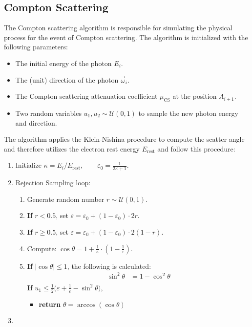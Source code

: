 \subsection{Compton Scattering}

The Compton scattering algorithm is responsible for simulating the physical process for the event of Compton scattering. The algorithm is initialized with the following parameters:
\begin{itemize}
    \item The initial energy of the photon $E_i$.
    \item The (unit) direction of the photon $\vec{\omega}_i$.
    \item The Compton scattering attenuation coefficient $\mu_{\text{CS}}$ at the position
    $A_{i+1}$.
    \item Two random variables $u_1, u_2 \sim \mathcal{U}(0, 1)$ to sample the
    new photon energy and direction.
\end{itemize}

The algorithm applies the Klein-Nishina procedure to compute the scatter angle
and therefore utilizes the electron rest energy $E_\text{rest}$ and follow this
procedure:

\begin{enumerate}[label=\Roman*.]
    \item Initialize $\kappa = E_i/ E_\text{rest}, \qquad \varepsilon_0 = \frac{1}{2\kappa + 1}$.
    \item Rejection Sampling loop:
        \begin{enumerate}[label=\arabic*.]
            \item Generate random number $r\sim\mathcal{U}(0,1)$.
            \item \textbf{If} $r < 0.5$, set $\varepsilon = \varepsilon_0 +
            (1-\varepsilon_0) \cdot 2r$.
            \item \textbf{If} $r \geq 0.5$, set $\varepsilon = \varepsilon_0 +
            (1-\varepsilon_0) \cdot 2(1-r)$.
            \item Compute: $\cos \theta = 1 + \frac{1}{\kappa} \cdot (1-\frac{1}{\varepsilon})$.
            \item \textbf{If} $\vert \cos \theta \vert \leq 1$, the following is calculated:
                \begin{align*}
                    \sin^2 \theta &= 1 - \cos^2 \theta \\
                \end{align*}
                \textbf{If} $u_1 \leq \frac{1}{2}\bigg(\varepsilon + \frac{1}{\varepsilon}- \sin^2 \theta\bigg)$, 
                    \begin{itemize}
                        \item \textbf{return } $\theta = \arccos(\cos \theta)$
                    \end{itemize}
        \end{enumerate}
    \item 
\end{enumerate}

